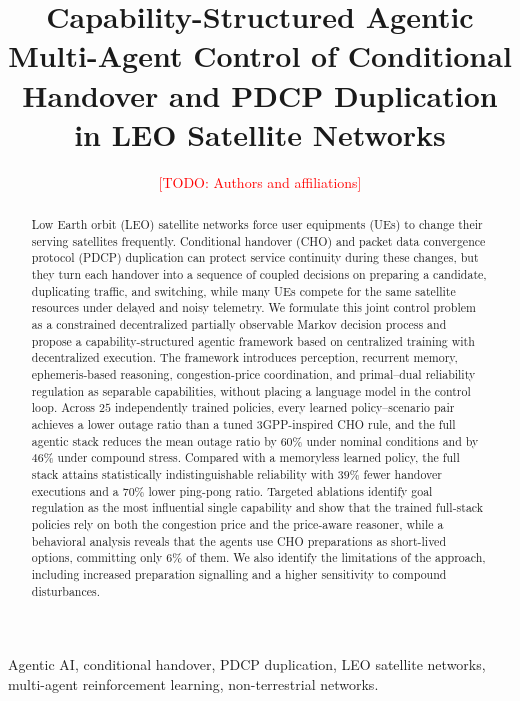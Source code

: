 \documentclass[journal]{IEEEtran}
\newcommand{\todo}[1]{\textcolor{red}{[TODO: #1]}}
\begin{document}
\title{Capability-Structured Agentic Multi-Agent Control of Conditional Handover and PDCP Duplication in LEO Satellite Networks}
\author{\todo{Authors and affiliations}}
\maketitle

\begin{abstract}
Low Earth orbit (LEO) satellite networks force user equipments (UEs) to change
their serving satellites frequently. Conditional handover (CHO) and packet
data convergence protocol (PDCP) duplication can protect service continuity
during these changes, but they turn each handover into a sequence of coupled
decisions on preparing a candidate, duplicating traffic, and switching, while
many UEs compete for the same satellite resources under delayed and noisy
telemetry. We formulate this joint control problem as a constrained
decentralized partially observable Markov decision process and propose a
capability-structured agentic framework based on centralized training with
decentralized execution. The framework introduces perception, recurrent
memory, ephemeris-based reasoning, congestion-price coordination, and
primal--dual reliability regulation as separable capabilities, without placing
a language model in the control loop. Across $25$ independently trained
policies, every learned policy--scenario pair achieves a lower outage ratio
than a tuned 3GPP-inspired CHO rule, and the full agentic stack reduces the
mean outage ratio by $60\%$ under nominal conditions and by $46\%$ under
compound stress. Compared with a memoryless learned policy, the full stack
attains statistically indistinguishable reliability with $39\%$ fewer handover
executions and a $70\%$ lower ping-pong ratio. Targeted ablations identify
goal regulation as the most influential single capability and show that the
trained full-stack policies rely on both the congestion price and the
price-aware reasoner, while a behavioral analysis reveals that the agents use
CHO preparations as short-lived options, committing only $6\%$ of them. We also identify the
limitations of the approach, including increased preparation signalling and
a higher sensitivity to compound disturbances.
\end{abstract}

\begin{IEEEkeywords}
Agentic AI, conditional handover, PDCP duplication, LEO satellite
networks, multi-agent reinforcement learning, non-terrestrial networks.
\end{IEEEkeywords}
\end{document}
